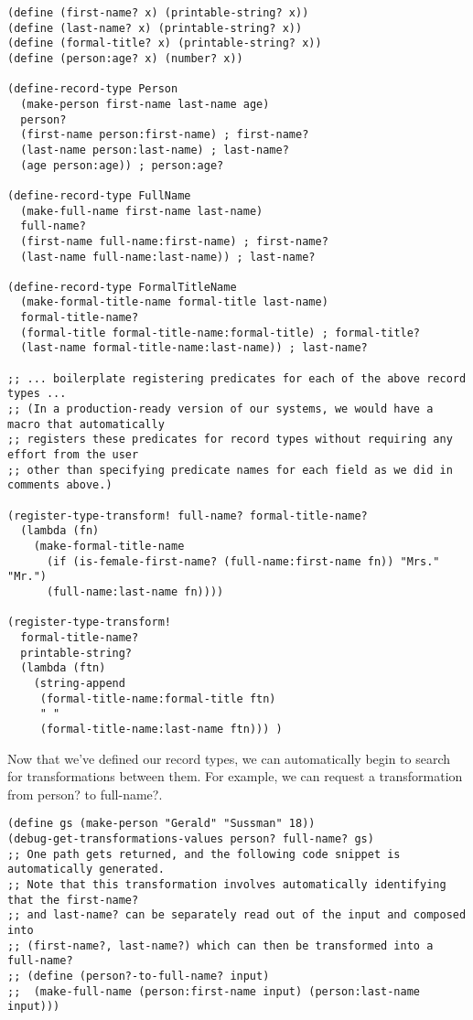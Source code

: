 \documentclass[letterpaper]{article}
\begin{document}
\begin{verbatim}
(define (first-name? x) (printable-string? x))
(define (last-name? x) (printable-string? x))
(define (formal-title? x) (printable-string? x))
(define (person:age? x) (number? x))

(define-record-type Person
  (make-person first-name last-name age)
  person?
  (first-name person:first-name) ; first-name?
  (last-name person:last-name) ; last-name?
  (age person:age)) ; person:age?

(define-record-type FullName
  (make-full-name first-name last-name)
  full-name?
  (first-name full-name:first-name) ; first-name?
  (last-name full-name:last-name)) ; last-name?

(define-record-type FormalTitleName
  (make-formal-title-name formal-title last-name)
  formal-title-name?
  (formal-title formal-title-name:formal-title) ; formal-title?
  (last-name formal-title-name:last-name)) ; last-name?

;; ... boilerplate registering predicates for each of the above record types ...
;; (In a production-ready version of our systems, we would have a macro that automatically
;; registers these predicates for record types without requiring any effort from the user
;; other than specifying predicate names for each field as we did in comments above.)

(register-type-transform! full-name? formal-title-name? 
  (lambda (fn)
    (make-formal-title-name 
      (if (is-female-first-name? (full-name:first-name fn)) "Mrs." "Mr.")
      (full-name:last-name fn))))

(register-type-transform! 
  formal-title-name?
  printable-string? 
  (lambda (ftn) 
    (string-append 
     (formal-title-name:formal-title ftn) 
     " "
     (formal-title-name:last-name ftn))) )
\end{verbatim}

Now that we've defined our record types, we can automatically begin to search for transformations between them. For example, we can request a transformation from person? to full-name?.

\begin{verbatim}
(define gs (make-person "Gerald" "Sussman" 18))
(debug-get-transformations-values person? full-name? gs)
;; One path gets returned, and the following code snippet is automatically generated.
;; Note that this transformation involves automatically identifying that the first-name? 
;; and last-name? can be separately read out of the input and composed into 
;; (first-name?, last-name?) which can then be transformed into a full-name?
;; (define (person?-to-full-name? input)
;;  (make-full-name (person:first-name input) (person:last-name input)))
\end{verbatim}
\end{document}
